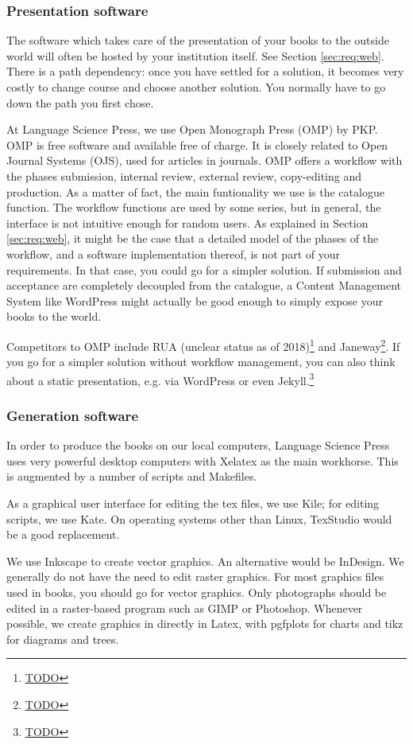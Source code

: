 \documentclass[guidelines,nonflat,modfonts] {langsci/langscibook}
\newcommand{\footurl}[1]{\footnote{\url{#1}}}
\begin{document}
\subsubsection{Presentation software}
The software which takes care of the presentation of your books to the outside world will often be hosted by your institution itself. See Section \ref{sec:req:web}. There is a path dependency: once you have settled for a solution, it becomes very costly to change course and choose another solution. You normally have to go down the path you first chose. 

At Language Science Press, we use Open Monograph Press (OMP) by PKP. OMP is free software and available free of charge. It is closely related to Open Journal Systems (OJS), used for articles in journals. OMP offers a workflow with the phases submission, internal review, external review, copy-editing and production. As a matter of fact, the main funtionality we use is the catalogue function. The workflow functions are used by some series, but in general, the interface is not intuitive enough for random users. As explained in Section \ref{sec:req:web}, it might be the case that a detailed model of the phases of the workflow, and a software implementation thereof, is not part of your requirements. In that case, you could go for a simpler solution. If submission and acceptance are completely decoupled from the catalogue, a Content Management System like WordPress might actually be good enough to simply expose your books to the world. 

Competitors to OMP include RUA (unclear status as of 2018)\footurl{TODO} and Janeway\footurl{TODO}. If you go for a simpler solution without workflow management, you can also think about a static presentation, e.g. via WordPress or even Jekyll.\footurl{TODO} 

\subsubsection{Generation software}
In order to produce the books on our local computers, Language Science Press uses very powerful desktop computers with Xelatex as the main workhorse. This is augmented by a number of scripts and Makefiles. 

As a graphical user interface for editing the tex files, we use Kile; for editing scripts, we use Kate. On operating systems other than Linux, TexStudio would be a good replacement. 

We use Inkscape to create vector graphics. An alternative would be InDesign. We generally do not have the need to edit raster graphics. For most graphics files used in books, you should go for vector graphics. Only photographs should be edited in a raster-based program such as GIMP or Photoshop. Whenever possible, we create graphics in directly in Latex, with pgfplots for charts and tikz for diagrams and trees. 
\end{document}
